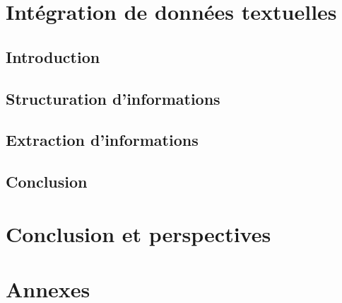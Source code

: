 
\part{Intégration de données textuelles}

\chapter{Introduction}
\minitoc


\chapter{Structuration d'informations}
\minitoc


\chapter{Extraction d'informations}
\minitoc


\chapter{Conclusion}



\part{Conclusion et perspectives}


\cleardoublepage    %
\appendix
\part{Annexes}

\clearpage
\backmatter


\printglossary
{}
\printglossary[type=acronym]
